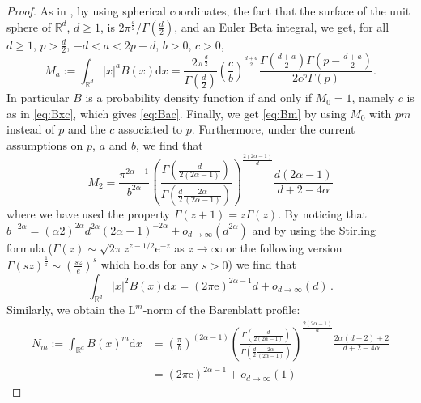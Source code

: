 \documentclass[10pt,reqno]{amsart}
\numberwithin{equation}{section}
\begin{document}
\begin{proof}
As in \cite{MR3103175}, by using spherical coordinates, the fact that the surface of the unit sphere of $\mathbb{R}^d$, $d\geq1$, is $2\pi^{\frac{d}{2}}/\Gamma(\frac{d}{2})$, and an Euler Beta integral, we get, for all $d\geq1$, $p>\frac{d}{2}$, $-d<a<2p-d$, $b>0$, $c>0$, 
\begin{equation}\label{eq:Ba}
  M_a:=
   \int_{\mathbb{R}^d}|x|^aB(x)\mathrm{d}x
   =\frac{2\pi^{\frac{d}{2}}}{\Gamma(\frac{d}{2})}
    \left(\frac{c}{b}\right)^{\frac{d+a}{2}}
    \frac{\Gamma(\frac{d+a}{2})\Gamma\left (p-\frac{d+a}{2}\right)}{2c^p\Gamma(p)}.
\end{equation}
In particular $B$ is a probability density function if and only if $M_0=1$, namely $c$ is as in \eqref{eq:Bxc}, which gives \eqref{eq:Bac}. 
Finally, we get \eqref{eq:Bm} by using $M_0$ with $pm$ instead of $p$ and the $c$ associated to $p$.
Furthermore, under the current assumptions on $p$, $a$ and $b$, we find that
\begin{equation}\label{eq:Momentsfast}
    M_2= \frac{\pi^{2\alpha-1}}{b^{2\alpha}}\left(\frac{\Gamma(\frac{d}{2(2\alpha-1)})}{\Gamma(\frac{d}{2}\frac{2\alpha}{(2\alpha-1)})}\right)^\frac{2(2\alpha-1)}{d} \frac{d(2\alpha-1)}{d+2-4\alpha}
\end{equation}
where we have used the property $\Gamma(z+1)=z\Gamma(z)$. By noticing that $b^{-2\alpha}=(\alpha2)^{2\alpha}d^{2\alpha}(2\alpha-1)^{-2\alpha}+o_{d\rightarrow\infty}(d^{2\alpha})$ and by using the Stirling formula ($\Gamma(z)\sim \sqrt{2\pi}z^{z-1/2}\mathrm{e}^{-z}$ as $z\rightarrow\infty$ or the following version $\Gamma(sz)^\frac{1}{z}\sim \left(\frac{sz}{e}\right)^s$ which holds for any $s>0$)
we find that
\begin{equation}
     \int_{\mathbb{R}^d}|x|^2 B(x)\mathrm{d}x =(2\pi\mathrm{e})^{2\alpha-1} d + o_{d\rightarrow\infty}(d)\,.
\end{equation}
Similarly, we obtain the $\mathrm{L}^m$-norm of the Barenblatt profile:
\begin{equation}\label{eq:Bmnorm}\begin{split}
N_m:=\int_{\mathbb{R}^d}B(x)^m\mathrm{d}x & =  \left(\frac{\pi}{b}\right)^{(2\alpha-1)}\left(\frac{\Gamma(\frac{d}{2(2\alpha-1)})}{\Gamma(\frac{d}{2}\frac{2\alpha}{(2\alpha-1)})}\right)^\frac{2(2\alpha-1)}{d}\frac{2\alpha(d-2)+2}{d+2-4\alpha} \\
& = \left(2\pi\mathrm{e}\right)^{2\alpha-1} + o_{d\rightarrow\infty}(1)
\end{split}\end{equation}

\end{proof}
\end{document}
